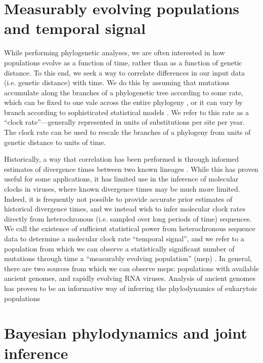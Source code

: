 \section{Measurably evolving populations and temporal signal}

While performing phylogenetic analyses, we are often interested in how populations evolve as a function of time, rather than as a function of genetic distance.
To this end, we seek a way to correlate differences in our input data (i.e. genetic distance) with time.
We do this by assuming that mutations accumulate along the branches of a phylogenetic tree according to some rate, which can be fixed to one vale across the entire phylogeny \cite{strictClockPaper}, or it can vary by branch according to sophisticated statistical models \cite{unocrrelatedRelaxedClocks, randomLocalClocks}.
We refer to this rate as a ``clock rate''---generally represented in units of substitutions per site per year.
The clock rate can be used to rescale the branches of a phylogeny from units of genetic distance to units of time.

Historically, a way that correlation has been performed is through informed estimates of divergence times between two known lineages \cite{humanApeDivergence}.
While this has proven useful for some applications, it has limited use in the inference of molecular clocks in viruses, where known divergence times may be much more limited.
Indeed, it is frequently not possible to provide accurate prior estimates of historical divergence times, and we instead wish to infer molecular clock rates directly from heterochronous (i.e. sampled over long periods of time) sequences.
We call the existence of sufficient statistical power from heterochronous sequence data to determine a molecular clock rate ``temporal signal'', and we refer to a population from which we can observe a statistically significant number of mutations through time a ``measurably evolving population'' (\gls{mep}) \cite{drummond2003MEP}.
In general, there are two sources from which we can observe \gls{mep}s: populations with available ancient genomes, and rapidly evolving RNA viruses.
Analysis of ancient genomes has proven to be an informative way of inferring the phylodynamics of eukarytoic populations \cite{shapiro2004bison}



\section{Bayesian phylodynamics and joint inference}

